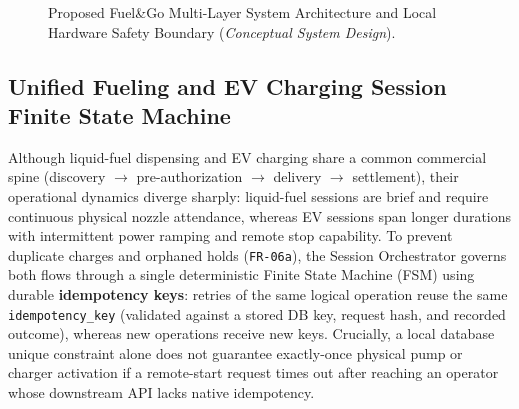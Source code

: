 \begin{figure}[!htbp]
  \centering
  
  \caption{Proposed Fuel\&Go Multi-Layer System Architecture and Local Hardware Safety Boundary (\emph{Conceptual System Design}).}
  \label{fig:arch-multilayer}
\end{figure}

\subsection{Unified Fueling and EV Charging Session Finite State Machine}
\label{sec:arch-fsm}

Although liquid-fuel dispensing and EV charging share a common commercial spine (discovery $\rightarrow$ pre-authorization $\rightarrow$ delivery $\rightarrow$ settlement), their operational dynamics diverge sharply: liquid-fuel sessions are brief and require continuous physical nozzle attendance, whereas EV sessions span longer durations with intermittent power ramping and remote stop capability. To prevent duplicate charges and orphaned holds (\texttt{FR-06a}), the Session Orchestrator governs both flows through a single deterministic Finite State Machine (FSM) using durable \textbf{idempotency keys}: retries of the same logical operation reuse the same \texttt{idempotency\_key} (validated against a stored DB key, request hash, and recorded outcome), whereas new operations receive new keys. Crucially, a local database unique constraint alone does not guarantee exactly-once physical pump or charger activation if a remote-start request times out after reaching an operator whose downstream API lacks native idempotency.

